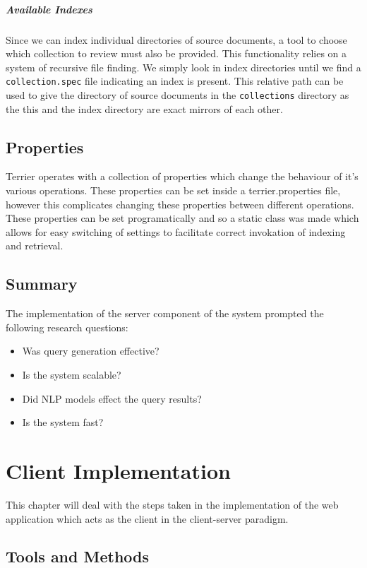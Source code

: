 \documentclass{l4proj}
\newcommand{\code}[1]{\texttt{#1}}
\begin{document}
\paragraph{Available Indexes}
Since we can index individual directories of source documents, a tool to choose which collection to review must also be provided. This functionality relies on a system of recursive file finding. We simply look in index directories until we find a \code{collection.spec} file indicating an index is present. This relative path can be used to give the directory of source documents in the \code{collections} directory as the this and the index directory are exact mirrors of each other.

\section{Properties}
Terrier operates with a collection of properties which change the behaviour of it's various operations. These properties can be set inside a terrier.properties file, however this complicates changing these properties between different operations. These properties can be set programatically and so a static class was made which allows for easy switching of settings to facilitate correct invokation of indexing and retrieval.

\section{Summary} \label{serversummary}
The implementation of the server component of the system prompted the following research questions:
\begin{itemize}
\item Was query generation effective?
\item Is the system scalable?
\item Did NLP models effect the query results?
\item Is the system fast?
\end{itemize}

\chapter{Client Implementation} \label{clientimplementation}
This chapter will deal with the steps taken in the implementation of the web application which acts as the client in the client-server paradigm.

\section{Tools and Methods}
\end{document}
